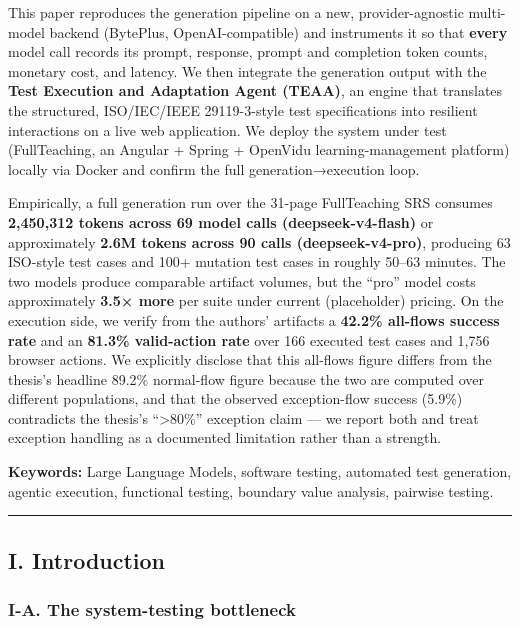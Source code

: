 \documentclass[
]{article}
\begin{document}
This paper reproduces the generation pipeline on a new,
provider-agnostic multi-model backend (BytePlus, OpenAI-compatible) and
instruments it so that \textbf{every} model call records its prompt,
response, prompt and completion token counts, monetary cost, and
latency. We then integrate the generation output with the \textbf{Test
Execution and Adaptation Agent (TEAA)}, an engine that translates the
structured, ISO/IEC/IEEE 29119-3-style test specifications into
resilient interactions on a live web application. We deploy the system
under test (FullTeaching, an Angular + Spring + OpenVidu
learning-management platform) locally via Docker and confirm the full
generation→execution loop.

Empirically, a full generation run over the 31-page FullTeaching SRS
consumes \textbf{2,450,312 tokens across 69 model calls
(deepseek-v4-flash)} or approximately \textbf{2.6M tokens across 90
calls (deepseek-v4-pro)}, producing 63 ISO-style test cases and 100+
mutation test cases in roughly 50--63 minutes. The two models produce
comparable artifact volumes, but the ``pro'' model costs approximately
\textbf{3.5× more} per suite under current (placeholder) pricing. On the
execution side, we verify from the authors' artifacts a \textbf{42.2\%
all-flows success rate} and an \textbf{81.3\% valid-action rate} over
166 executed test cases and 1,756 browser actions. We explicitly
disclose that this all-flows figure differs from the thesis's headline
89.2\% normal-flow figure because the two are computed over different
populations, and that the observed exception-flow success (5.9\%)
contradicts the thesis's ``\textgreater80\%'' exception claim --- we
report both and treat exception handling as a documented limitation
rather than a strength.

\textbf{Keywords:} Large Language Models, software testing, automated
test generation, agentic execution, functional testing, boundary value
analysis, pairwise testing.

\begin{center}\rule{0.5\linewidth}{0.5pt}\end{center}

\subsection{I. Introduction}\label{i.-introduction}

\subsubsection{I-A. The system-testing
bottleneck}\label{i-a.-the-system-testing-bottleneck}
\end{document}
